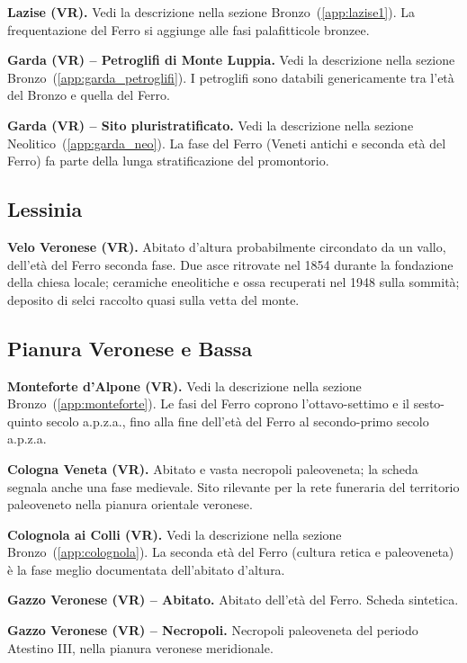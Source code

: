 \textbf{Lazise (VR).} \label{app:lazise_ferro} Vedi la descrizione nella sezione Bronzo~(\ref{app:lazise1}). La frequentazione del Ferro si aggiunge alle fasi palafitticole bronzee.

\textbf{Garda (VR) -- Petroglifi di Monte Luppia.} \label{app:garda_ferro} Vedi la descrizione nella sezione Bronzo~(\ref{app:garda_petroglifi}). I petroglifi sono databili genericamente tra l'età del Bronzo e quella del Ferro.

\textbf{Garda (VR) -- Sito pluristratificato.} Vedi la descrizione nella sezione Neolitico~(\ref{app:garda_neo}). La fase del Ferro (Veneti antichi e seconda età del Ferro) fa parte della lunga stratificazione del promontorio.

\subsection{Lessinia}

\textbf{Velo Veronese (VR).} Abitato d'altura probabilmente circondato da un vallo, dell'età del Ferro seconda fase. Due asce ritrovate nel 1854 durante la fondazione della chiesa locale; ceramiche eneolitiche e ossa recuperati nel 1948 sulla sommità; deposito di selci raccolto quasi sulla vetta del monte.

\subsection{Pianura Veronese e Bassa}

\textbf{Monteforte d'Alpone (VR).} \label{app:monteforte_ferro} Vedi la descrizione nella sezione Bronzo~(\ref{app:monteforte}). Le fasi del Ferro coprono l'ottavo-settimo e il sesto-quinto secolo a.p.z.a., fino alla fine dell'età del Ferro al secondo-primo secolo a.p.z.a.

\textbf{Cologna Veneta (VR).} Abitato e vasta necropoli paleoveneta; la scheda segnala anche una fase medievale. Sito rilevante per la rete funeraria del territorio paleoveneto nella pianura orientale veronese.

\textbf{Colognola ai Colli (VR).} \label{app:colognola_ferro} Vedi la descrizione nella sezione Bronzo~(\ref{app:colognola}). La seconda età del Ferro (cultura retica e paleoveneta) è la fase meglio documentata dell'abitato d'altura.

\textbf{Gazzo Veronese (VR) -- Abitato.} Abitato dell'età del Ferro. Scheda sintetica.

\textbf{Gazzo Veronese (VR) -- Necropoli.} Necropoli paleoveneta del periodo Atestino III, nella pianura veronese meridionale.

